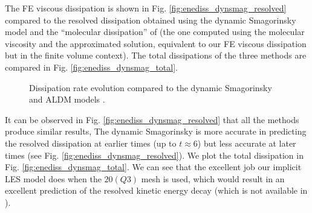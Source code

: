 The FE viscous dissipation is shown in Fig. \ref{fig:enediss_dynsmag_resolved} compared to the resolved dissipation obtained using the dynamic Smagorinsky model \cite{fauconnier_construction_2009} and the ``molecular dissipation'' of \cite{hickel_adaptive_2006} (the one computed using the molecular viscosity and the approximated solution, equivalent to our FE viscous dissipation but in the finite volume context). The total dissipations of the three methods are compared in Fig. \ref{fig:enediss_dynsmag_total}. 
\begin{figure}[h!]
	\centering	
	\caption{Dissipation rate evolution compared to the dynamic Smagorinsky \cite{fauconnier_construction_2009} and ALDM models \cite{hickel_adaptive_2006}.}
	\label{fig:enediss_dynsmag}
\end{figure}

It can be observed in Fig. \ref{fig:enediss_dynsmag_resolved} that all the methods produce similar results, %
The dynamic Smagorinsky is more accurate in predicting the resolved dissipation at earlier times (up to $t\approx{}6$) but less accurate at later times (see Fig. \ref{fig:enediss_dynsmag_resolved}). 
We plot the total dissipation in Fig. \ref{fig:enediss_dynsmag_total}. We can see that the excellent job our implicit LES model does when the $20 (Q3)$ mesh is used, which would result in an excellent prediction of the resolved kinetic energy decay (which is not available in \cite{hickel_adaptive_2006}). 

